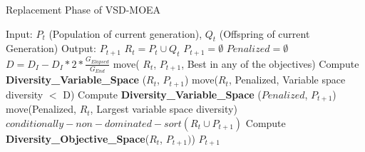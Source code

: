 \begin{algorithm}[t]
  \scriptsize
	\caption{Replacement Phase of VSD-MOEA} 
\begin{algorithmic}[1]
\STATE Input: $P_t$ (Population of current generation), $Q_t$ (Offspring of current Generation)
    	\STATE Output: $P_{t+1}$
        \STATE $R_t = P_t \cup Q_t$
        \STATE $P_{t+1} = \emptyset$
        \STATE $Penalized = \emptyset$
				\STATE $D = D_I - D_I *2* \frac{G_{Elapsed}}{G_{End}}$ \label{DInicial} 			
		\STATE move( $R_t$,  $P_{t+1}$, Best in any of the objectives) 
        \label{alg:Extremos}
			\STATE Compute \textbf{Diversity\_Variable\_Space} ($R_t$, $P_{t+1}$) \label{alg:Calculo_Diversidad_Primero}
		\STATE move($R_t$, Penalized, Variable space diversity $ < $ D)  \label{alg:Calculo_Diversidad_Primero_Move}
				\STATE Compute \textbf{Diversity\_Variable\_Space} ($Penalized$, $P_{t+1}$) \label{alg:Penalized_Diversity}
				\STATE move(Penalized, $R_t$, Largest variable space diversity) \label{alg:Penalized_Diversity_move}
        \ENDIF
		\STATE $conditionally-non-dominated-sort(R_t \cup P_{t+1}) $\label{alg:rank}
		\STATE Compute \textbf{Diversity\_Objective\_Space}($R_t$, $P_{t+1})$) \label{alg:Diversity_Space}
        \ENDWHILE
    	\RETURN $P_{t+1}$
	\end{algorithmic}
\label{alg:Replacement_Phase}
\end{algorithm}


